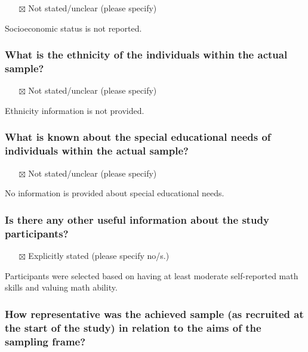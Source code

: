 \documentclass[
  doc, a4paper]{apa7}
\providecommand{\tightlist}{%
  \setlength{\itemsep}{0pt}\setlength{\parskip}{0pt}}
\begin{document}
\begin{itemize}
\tightlist
\item[$\boxtimes$]
  Not stated/unclear (please specify)
\end{itemize}

Socioeconomic status is not reported.

\subsubsection{What is the ethnicity of the individuals within the actual sample?}\label{what-is-the-ethnicity-of-the-individuals-within-the-actual-sample}

\begin{itemize}
\tightlist
\item[$\boxtimes$]
  Not stated/unclear (please specify)
\end{itemize}

Ethnicity information is not provided.

\subsubsection{What is known about the special educational needs of individuals within the actual sample?}\label{what-is-known-about-the-special-educational-needs-of-individuals-within-the-actual-sample}

\begin{itemize}
\tightlist
\item[$\boxtimes$]
  Not stated/unclear (please specify)
\end{itemize}

No information is provided about special educational needs.

\subsubsection{Is there any other useful information about the study participants?}\label{is-there-any-other-useful-information-about-the-study-participants}

\begin{itemize}
\tightlist
\item[$\boxtimes$]
  Explicitly stated (please specify no/s.)
\end{itemize}

Participants were selected based on having at least moderate self-reported math skills and valuing math ability.

\subsubsection{How representative was the achieved sample (as recruited at the start of the study) in relation to the aims of the sampling frame?}\label{how-representative-was-the-achieved-sample-as-recruited-at-the-start-of-the-study-in-relation-to-the-aims-of-the-sampling-frame}
\end{document}
